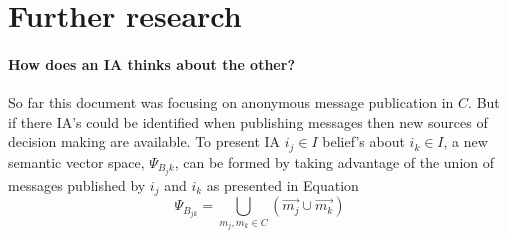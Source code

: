 \documentclass{article}
\begin{document}
	\section{Further research}
		\paragraph{How does an IA thinks about the other?} So far this document was focusing on anonymous message publication in $C$. But if there IA's could be identified when publishing messages then new sources of decision making are available. To present IA $i_j \in I$ belief's about $i_k \in I$, a new semantic vector space, $\Psi_{B_jk}$, can be formed by taking advantage of the union of messages published by $i_j$ and $i_k$ as presented in Equation
				\begin{equation}
					\Psi_{B_{jk}} = \bigcup_{m_j,m_k \in C} (\vec{m_j} \cup \vec{m_k}) 
				\end{equation}
\end{document}

